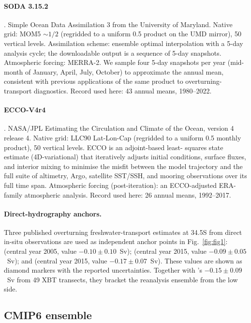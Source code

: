 \documentclass[12pt,a4paper]{article}
\begin{document}
\paragraph{SODA 3.15.2} \citep{Carton2018}. Simple Ocean Data
Assimilation 3 from the University of Maryland. Native grid: MOM5
${\sim}1/2$\textdegree{} (regridded to a uniform 0.5\textdegree{}
product on the UMD mirror), 50 vertical levels. Assimilation scheme:
ensemble optimal interpolation with a 5-day analysis cycle; the
downloadable output is a sequence of 5-day snapshots. Atmospheric
forcing: MERRA-2. We sample four 5-day snapshots per year (mid-month
of January, April, July, October) to approximate the annual mean,
consistent with previous applications of the same product to
overturning-transport diagnostics. Record used here: 43 annual means,
1980--2022.

\paragraph{ECCO-V4r4} \citep{Forget2015}. NASA/JPL Estimating the
Circulation and Climate of the Ocean, version 4 release 4. Native
grid: LLC90 Lat-Lon-Cap (regridded to a uniform 0.5\textdegree{}
monthly product), 50 vertical levels. ECCO is an adjoint-based least-%
squares state estimate (4D-variational) that iteratively adjusts
initial conditions, surface fluxes, and interior mixing to minimise
the misfit between the model trajectory and the full suite of
altimetry, Argo, satellite SST/SSH, and mooring observations over
its full time span. Atmospheric forcing (post-iteration): an
ECCO-adjusted ERA-family atmospheric analysis. Record used here: 26
annual means, 1992--2017.

\paragraph{Direct-hydrography anchors.} Three published overturning
freshwater-transport estimates at 34.5\textdegree S from direct
in-situ observations are used as independent anchor points in
Fig.~\ref{fig:fig1}: \citet{GarzoliMatano2011} (central year 2005,
value ${-0.10\pm 0.10}$~Sv); \citet{Meinen2018} (central year 2015,
value ${-0.09\pm 0.05}$~Sv); and \citet{Kersale2020} (central year
2015, value ${-0.17\pm 0.07}$~Sv). These values are shown as diamond
markers with the reported uncertainties. Together with
\citet{Dong2024}'s $-0.15\pm 0.09$~Sv from 49 XBT transects, they
bracket the reanalysis ensemble from the low side.

\subsection*{CMIP6 ensemble}
\end{document}

